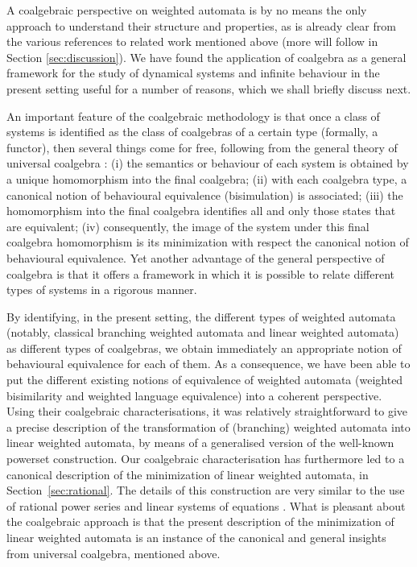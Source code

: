 \documentclass[3p]{elsarticle}
\begin{document}
A coalgebraic perspective on weighted automata is by no means the only
approach to understand their structure and properties, as is already
clear from the various references to related work mentioned above
(more will follow in Section \ref{sec:discussion}).
We have found the application of coalgebra as a general framework
for the study of dynamical systems and infinite behaviour
in the present setting useful for a number of reasons,
which we shall briefly discuss next.

An important feature of the coalgebraic methodology is that
once a class of systems is identified as the class
of coalgebras of a certain type (formally, a functor), then
several things come for free, following from the
general theory of universal coalgebra \cite{Rutten00}:
(i) the semantics or behaviour
of each system is obtained by a unique homomorphism into
the final coalgebra; (ii) with each coalgebra type, a canonical
notion of behavioural equivalence (bisimulation) is associated;
(iii) the homomorphism into the final coalgebra identifies
all and only those states that are
equivalent; (iv) consequently, the image of the system under this final
coalgebra homomorphism is its minimization with respect the canonical
notion of behavioural equivalence.
Yet another advantage of the general perspective of coalgebra is that
it offers a framework in which it is possible to relate
different types of systems in a rigorous manner.

By identifying, in the present setting, the different types of weighted
automata (notably, classical branching weighted automata and linear weighted
automata) as different types of coalgebras, we obtain
immediately an appropriate notion of behavioural equivalence
for each of them.
As a consequence, we have been able to
put the different existing notions of equivalence
of weighted automata (weighted bisimilarity and weighted
language equivalence) into a coherent perspective.
Using their
coalgebraic characterisations, it was relatively straightforward
to give a precise description of the transformation
of (branching) weighted automata into linear weighted automata,
by means of a generalised version of the well-known powerset
construction.
Our coalgebraic characterisation
has furthermore led to a canonical description of the minimization
of linear weighted automata,
in Section~\ref{sec:rational}. The details of this construction
are very similar to the use of rational power series
and linear systems of equations \cite{BR-series}. What is
pleasant about the coalgebraic approach is that the present description
of the minimization of linear weighted automata is an instance
of the canonical and general insights from universal coalgebra,
mentioned above.
\end{document}
